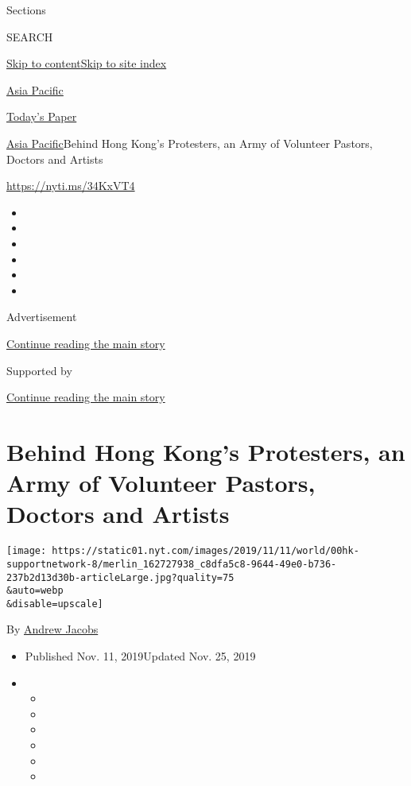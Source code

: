 Sections

SEARCH

\protect\hyperlink{site-content}{Skip to
content}\protect\hyperlink{site-index}{Skip to site index}

\href{https://www.nytimes.com/section/world/asia}{Asia Pacific}

\href{https://myaccount.nytimes.com/auth/login?response_type=cookie\&client_id=vi}{}

\href{https://www.nytimes.com/section/todayspaper}{Today's Paper}

\href{/section/world/asia}{Asia Pacific}\textbar{}Behind Hong Kong's
Protesters, an Army of Volunteer Pastors, Doctors and Artists

\url{https://nyti.ms/34KxVT4}

\begin{itemize}
\item
\item
\item
\item
\item
\item
\end{itemize}

Advertisement

\protect\hyperlink{after-top}{Continue reading the main story}

Supported by

\protect\hyperlink{after-sponsor}{Continue reading the main story}

\hypertarget{behind-hong-kongs-protesters-an-army-of-volunteer-pastors-doctors-and-artists}{%
\section{Behind Hong Kong's Protesters, an Army of Volunteer Pastors,
Doctors and
Artists}\label{behind-hong-kongs-protesters-an-army-of-volunteer-pastors-doctors-and-artists}}

\texttt{[image: https://static01.nyt.com/images/2019/11/11/world/00hk-supportnetwork-8/merlin\_162727938\_c8dfa5c8-9644-49e0-b736-237b2d13d30b-articleLarge.jpg?quality=75\\\&auto=webp\\\&disable=upscale]}

By \href{https://www.nytimes.com/by/andrew-jacobs}{Andrew Jacobs}

\begin{itemize}
\item
  Published Nov. 11, 2019Updated Nov. 25, 2019
\item
  \begin{itemize}
  \item
  \item
  \item
  \item
  \item
  \item
  \end{itemize}
\end{itemize}

